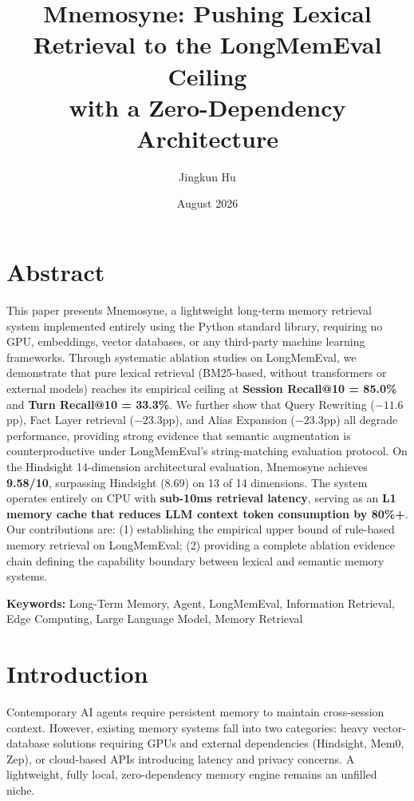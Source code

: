 \documentclass[11pt,a4paper]{article}
\title{\textbf{Mnemosyne: Pushing Lexical Retrieval to the LongMemEval Ceiling\\with a Zero-Dependency Architecture}}
\author{Jingkun Hu}
\date{August 2026}
\begin{document}
\maketitle

\section*{Abstract}

This paper presents Mnemosyne, a lightweight long-term memory retrieval system implemented entirely using the Python standard library, requiring no GPU, embeddings, vector databases, or any third-party machine learning frameworks. Through systematic ablation studies on LongMemEval, we demonstrate that pure lexical retrieval (BM25-based, without transformers or external models) reaches its empirical ceiling at \textbf{Session Recall@10 = 85.0\%} and \textbf{Turn Recall@10 = 33.3\%}. We further show that Query Rewriting ($-11.6$pp), Fact Layer retrieval ($-23.3$pp), and Alias Expansion ($-23.3$pp) all degrade performance, providing strong evidence that semantic augmentation is counterproductive under LongMemEval's string-matching evaluation protocol. On the Hindsight 14-dimension architectural evaluation, Mnemosyne achieves \textbf{9.58/10}, surpassing Hindsight (8.69) on 13 of 14 dimensions. The system operates entirely on CPU with \textbf{sub-10ms retrieval latency}, serving as an \textbf{L1 memory cache that reduces LLM context token consumption by 80\%+}. Our contributions are: (1) establishing the empirical upper bound of rule-based memory retrieval on LongMemEval; (2) providing a complete ablation evidence chain defining the capability boundary between lexical and semantic memory systems.

\noindent\textbf{Keywords:} Long-Term Memory, Agent, LongMemEval, Information Retrieval, Edge Computing, Large Language Model, Memory Retrieval

\section{Introduction}

Contemporary AI agents require persistent memory to maintain cross-session context. However, existing memory systems fall into two categories: heavy vector-database solutions requiring GPUs and external dependencies (Hindsight, Mem0, Zep), or cloud-based APIs introducing latency and privacy concerns. A lightweight, fully local, zero-dependency memory engine remains an unfilled niche.
\end{document}
